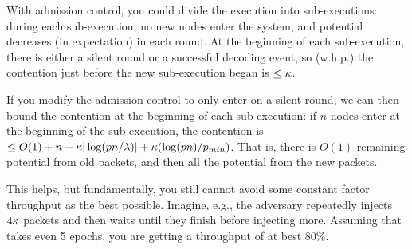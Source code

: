 With admission control, you could divide the execution into sub-executions: during each sub-execution, no new nodes enter the system, and potential decreases (in expectation) in each round.  At the beginning of each sub-execution, there is either a silent round or a successful decoding event, so (w.h.p.) the contention just before the new sub-execution began is $\leq \kappa$.  

If you modify the admission control to only enter on a silent round, we can then bound the contention at the beginning of each sub-execution: if $n$ nodes enter at the beginning of the sub-execution, the contention is $\leq O(1) + n + \kappa|\log(pn/\lambda)| + \kappa(\log(pn)/p_{min})$.  That is, there is $O(1)$ remaining potential from old packets, and then all the potential from the new packets.  

This helps, but fundamentally, you still cannot avoid some constant factor throughput as the best possible. Imagine, e.g., the adversary repeatedly injects $4\kappa$ packets and then waits until they finish before injecting more.  Assuming that takes even 5 epochs, you are getting a throughput of at best $80\%$. 